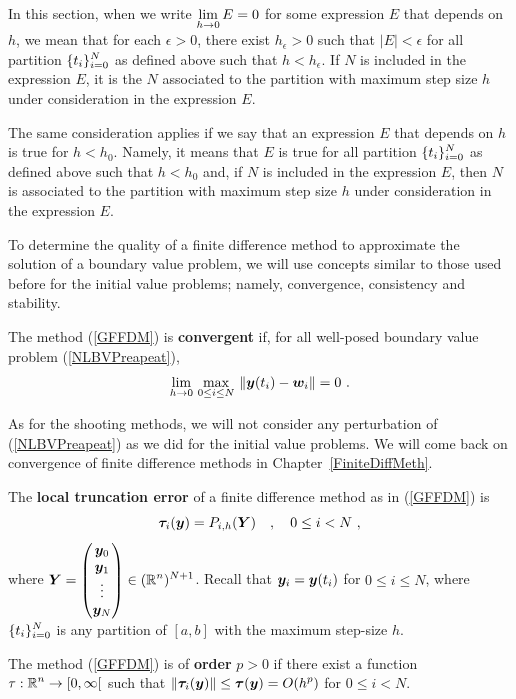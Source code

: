 \begin{rmk}[Important]
In this section, when we write $\displaystyle \lim_{h\to 0} E = 0$
for some expression $E$ that depends on $h$, we mean that for each
$\epsilon >0$, there exist $h_\epsilon >0$ such that
$|E| < \epsilon$ for all partition $\displaystyle \{t_i\}_{i=0}^N$ as defined
above such that $h<h_\epsilon$.  If $N$ is included in the expression
$E$, it is the $N$ associated to the partition with maximum step size
$h$ under consideration in the expression $E$.

The same consideration applies if we say that an expression $E$ that
depends on $h$ is true for $h < h_0$.  Namely, it means that $E$ is
true for all partition $\displaystyle \{t_i\}_{i=0}^N$ as defined
above such that $h<h_0$ and, if $N$ is included in the expression
$E$, then $N$ is associated to the partition with maximum step size
$h$ under consideration in the expression $E$.
\end{rmk}

To determine the quality of a finite difference method to approximate
the solution of a boundary value problem, we will use concepts similar
to those used before for the initial value problems; namely,
convergence, consistency and stability.

\begin{defn}
The method (\ref{GFFDM}) is
{\bfseries convergent} if, for all
well-posed boundary value problem (\ref{NLBVPreapeat}),
\[
\lim_{h \rightarrow 0}\,\max_{0\leq i \leq N} \,
\| \bm{y}(t_i) - \bm{w}_i \| = 0 \ .
\]
\end{defn}

\begin{rmk}
As for the shooting methods, we will not consider any perturbation of
(\ref{NLBVPreapeat}) as we did for the initial value problems.  We
will come back on convergence of finite difference methods in
Chapter~\ref{FiniteDiffMeth}. 
\end{rmk}

\begin{defn}
The {\bfseries local truncation error} of a finite difference method
as in (\ref{GFFDM}) is
\[
\bm{\tau}_i(\bm{y}) = P_{i,h}(\bm{Y}) \quad , \quad 0 \leq i < N \ ,
\]
where $\displaystyle \bm{Y} =
\begin{pmatrix} \bm{y}_0 \\ \bm{y}_1 \\ \vdots \\
\bm{y}_N \end{pmatrix} \in (\mathbb{R}^n)^{N+1}$.
Recall that $\bm{y}_i = \bm{y}(t_i)$ for $0 \leq i \leq N$, where
$\displaystyle \{t_i\}_{i=0}^N$ is any partition of $[a,b]$ with the
maximum step-size $h$.

The method (\ref{GFFDM}) is of
{\bfseries order} $p>0$ if there
exist a function $\displaystyle \tau :\mathbb{R}^n \to [0,\infty[$ such that
$\displaystyle \| \bm{\tau}_i(\bm{y}) \| \leq \bm{\tau}(\bm{y})  = O(h^p)$
for $0 \leq i < N$.
\end{defn}

